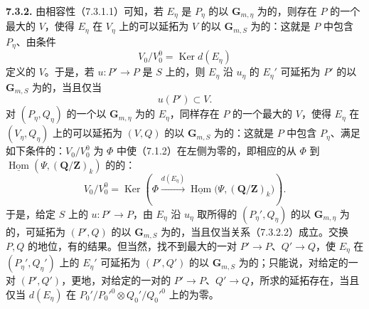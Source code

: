 \textbf{7.3.2.} 由相容性（7.3.1.1）可知，若 $E_\eta$ 是 $P_\eta$ 的以 $\mathbf G_{m,\eta}$ 为的，则存在 $P$ 的一个最大的 $V$，使得 $E_\eta$ 在 $V_\eta$ 上的可以延拓为 $V$ 的以 $\mathbf G_{m,S}$ 为的：这就是 $P$ 中包含 $P_\eta$、由条件
\[
V_0/V_0^0=\operatorname{Ker}d(E_\eta)\tag{7.3.2.1}
\]
定义的 $V$。于是，若 $u:P'\to P$ 是 $S$ 上的，则 $E_\eta$ 沿 $u_\eta$ 的 $E_\eta'$ 可延拓为 $P'$ 的以 $\mathbf G_{m,S}$ 为的，当且仅当
\[
u(P')\subset V.\tag{7.3.2.2}
\]
对 $(P_\eta,Q_\eta)$ 的一个以 $\mathbf G_{m,\eta}$ 为的 $E_\eta$，同样存在 $P$ 的一个最大的 $V$，使得 $E_\eta$ 在 $(V_\eta,Q_\eta)$ 上的可以延拓为 $(V,Q)$ 的以 $\mathbf G_{m,S}$ 为的：这就是 $P$ 中包含 $P_\eta$、满足如下条件的：$V_0/V_0^0$ 为 $\Phi$ 中使（7.1.2）在左侧为零的，即相应的从 $\Phi$ 到 $\underline{\operatorname{Hom}}(\Psi,(\mathbf Q/\mathbf Z)_k)$ 的的：
\[
V_0/V_0^0=\operatorname{Ker}\left(
\Phi\xrightarrow{d(E_\eta)}\underline{\operatorname{Hom}}\bigl(\Psi,(\mathbf Q/\mathbf Z)_k\bigr)\right).\tag{7.3.2.3}
\]
于是，给定 $S$ 上的 $u:P'\to P$，由 $E_\eta$ 沿 $u_\eta$ 取所得的 $(P_\eta',Q_\eta)$ 的以 $\mathbf G_{m,\eta}$ 为的，可延拓为 $(P',Q)$ 的以 $\mathbf G_{m,S}$ 为的，当且仅当关系（7.3.2.2）成立。交换 $P,Q$ 的地位，有的结果。但当然，找不到最大的一对 $P'\to P$、$Q'\to Q$，使 $E_\eta$ 在 $(P_\eta',Q_\eta')$ 上的 $E_\eta'$ 可延拓为 $(P',Q')$ 的以 $\mathbf G_{m,S}$ 为的；只能说，对给定的一对 $(P',Q')$，更地，对给定的一对的 $P'\to P$、$Q'\to Q$，所求的延拓存在，当且仅当 $d(E_\eta)$ 在 $P_0'/P_0'^0\otimes Q_0'/Q_0'^0$ 上的为零。
